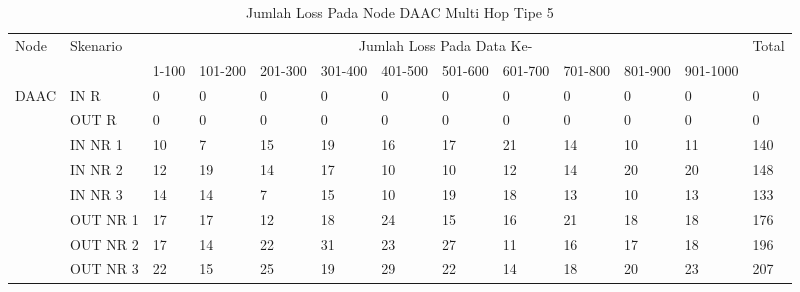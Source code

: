 \begin{table}[H]
  \centering
  \caption{Jumlah Loss Pada Node DAAC Multi Hop Tipe 5}
    \begin{tabular}{|p{1cm}|p{1.9cm}|p{0.6cm}|p{0.6cm}|p{0.6cm}|p{0.6cm}|p{0.6cm}|p{0.6cm}|p{0.6cm}|p{0.6cm}|p{0.6cm}|p{0.6cm}|p{1cm}|}
    \hline
        \multirow{2}{*}{Node}&\multirow{2}{*}{Skenario}&\multicolumn{10}{|c|}{Jumlah Loss Pada Data Ke-}&\multirow{2}{*}{Total} \\\cline{3-12}
          & & 1-100 & 101-200 & 201-300 & 301-400 & 401-500 & 501-600 & 601-700 & 701-800 & 801-900 & 901-1000 & \\
        \hline
    \multirow{8}{*}{DAAC}  
    & IN R  & 0     & 0     & 0     & 0     & 0     & 0     & 0     & 0     & 0     & 0     & 0 \\
          & OUT R & 0     & 0     & 0     & 0     & 0     & 0     & 0     & 0     & 0     & 0     & 0 \\
          & IN NR 1 & 10    & 7     & 15    & 19    & 16    & 17    & 21    & 14    & 10    & 11    & 140 \\
          & IN NR 2 & 12    & 19    & 14    & 17    & 10    & 10    & 12    & 14    & 20    & 20    & 148 \\
          & IN NR 3 & 14    & 14    & 7     & 15    & 10    & 19    & 18    & 13    & 10    & 13    & 133 \\
          & OUT NR 1 & 17    & 17    & 12    & 18    & 24    & 15    & 16    & 21    & 18    & 18    & 176 \\
          & OUT NR 2 & 17    & 14    & 22    & 31    & 23    & 27    & 11    & 16    & 17    & 18    & 196 \\
          & OUT NR 3 & 22    & 15    & 25    & 19    & 29    & 22    & 14    & 18    & 20    & 23    & 207 \\
    \hline
    \end{tabular}%
  \label{tab:addlabel}%
\end{table}%
